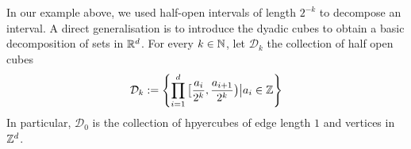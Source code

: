 In our example above, we used half-open intervals of length $2^{-k}$ to decompose an interval.
A direct generalisation is to introduce the dyadic cubes to obtain a basic decomposition of sets in $\mathbb{R}^{d}$.
For every $k \in \mathbb{N}$, let $\mathcal{D}_k$ the collection of half open cubes
\begin{align*}
  \mathcal{D}_k := \left\{
    \prod_{i=1}^{d}\big[\frac{a_i}{2^{k}}, \frac{a_{i+1}}{2^{k}}\big) \big\vert a_i \in \mathbb{Z}
  \right\}
\end{align*}  
In particular, $\mathcal{D}_0$ is the collection of hpyercubes of edge length $1$ and vertices in $\mathbb{Z}^d$.




